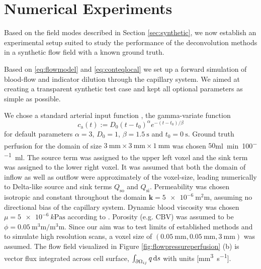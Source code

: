 \documentclass[journal,twocolumn]{IEEEtran}
\newcommand{\Qso}{Q_{\mathrm{so}}}
\newcommand{\Qsi}{Q_{\mathrm{si}}}
\newcommand{\ca}{c_\mathrm{a}}
\newcommand{\simu}{k\pascal\second}
\newcommand{\siFmm}{\milli\meter\cubed\per\second}
\newcommand{\siPml}{\milli\litre\per\minute\per100\milli\litre}
\begin{document}
	
	\section{Numerical Experiments}\label{sec:NumExp}
Based on the field modes described in Section \ref{sec:synthetic}, we now establish an experimental setup suited to study the performance of the deconvolution methods in a synthetic flow field with a known ground truth.

	Based on \eqref{eq:flowmodel} and \eqref{eq:conteqlocal} we set up a forward simulation of blood-flow and indicator dilution through the capillary system. We aimed at creating a transparent synthetic test case and kept all optional parameters as simple as possible. 
	
	We chose a standard arterial input function \cite{ostergaard96}, the gamma-variate function
	\begin{equation}
		\ca(t) := D_0(t-t_0)^\alpha e^{-(t-t_0)/\beta}
	\end{equation}
	for default parameters $\alpha=3$, $D_0 = 1$, $\beta = \SI{1.5}{\second}$ and $t_0 = \SI{0}{\second}$.
	Ground truth perfusion for the domain of size $\SI{3}{\milli\meter}\times\SI{3}{\milli\meter}\times\SI{1}{\milli\meter}$ was chosen $50$\si{\siPml}.
	The source term was assigned to the upper left voxel and the sink term was assigned to the lower right voxel.
	It was assumed that both the domain of inflow as well as outflow were approximately of the voxel-size, leading numerically to Delta-like source and sink terms $\Qso$ and $\Qsi$.
	Permeability was chosen isotropic and constant throughout the domain $\mathbf{k}=\SI{5e-6}{\square\milli\meter}$, assuming no directional bias of the capillary system.
	Dynamic blood viscosity was chosen $\mu=\SI{5e-6}{\simu}$ according to \cite{rosencranz06}.
	Porosity (e.g. CBV) was assumed to be $\phi = \SI{0.05}{\cubic\milli\meter\per\cubic\milli\meter}$.
	Since our aim was to test limits of established methods and to simulate high resolution scans, a voxel size of $(\SI{0.05}{\milli\meter},\SI{0.05}{\milli\meter},\SI{3}{\milli\meter})$ was assumed.
	The flow field visualized in Figure \ref{fig:flowpressureperfusion} (b) is vector flux integrated across cell surface, $\int_{\partial \Omega_{ij}}q \,\mathrm{d} s$  with units [\si{\siFmm}].
	
\end{document}

